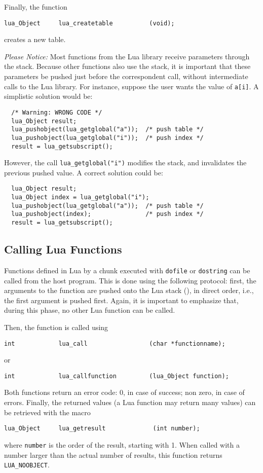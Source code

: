 Finally, the function
\begin{verbatim}
lua_Object     lua_createtable          (void);
\end{verbatim}
creates a new table.

{\em Please Notice:\/}
Most functions from the Lua library receive parameters through the stack.
Because other functions also use the stack,
it is important that these
parameters be pushed just before the correspondent call,
without intermediate calls to the Lua library.
For instance, suppose the user wants the value of \verb'a[i]'.
A simplistic solution would be:
\begin{verbatim}
  /* Warning: WRONG CODE */
  lua_Object result;
  lua_pushobject(lua_getglobal("a"));  /* push table */
  lua_pushobject(lua_getglobal("i"));  /* push index */
  result = lua_getsubscript();
\end{verbatim}
However, the call \verb'lua_getglobal("i")' modifies the stack,
and invalidates the previous pushed value.
A correct solution could be:
\begin{verbatim}
  lua_Object result;
  lua_Object index = lua_getglobal("i");
  lua_pushobject(lua_getglobal("a"));  /* push table */
  lua_pushobject(index);               /* push index */
  result = lua_getsubscript();
\end{verbatim}

\subsection{Calling Lua Functions}
Functions defined in Lua by a chunk executed with
\verb'dofile' or \verb'dostring' can be called from the host program.
This is done using the following protocol:
first, the arguments to the function are pushed onto the Lua stack
(), in direct order, i.e., the first argument is pushed first.
Again, it is important to emphasize that, during this phase,
no other Lua function can be called.

Then, the function is called using
\begin{verbatim}
int            lua_call                 (char *functionname);
\end{verbatim}
or
\begin{verbatim}
int            lua_callfunction         (lua_Object function);
\end{verbatim}
Both functions return an error code:
0, in case of success; non zero, in case of errors.
Finally, the returned values (a Lua function may return many values)
can be retrieved with the macro
\begin{verbatim}
lua_Object     lua_getresult             (int number);
\end{verbatim}
where \verb'number' is the order of the result, starting with 1.
When called with a number larger than the actual number of results,
this function returns \verb'LUA_NOOBJECT'.

